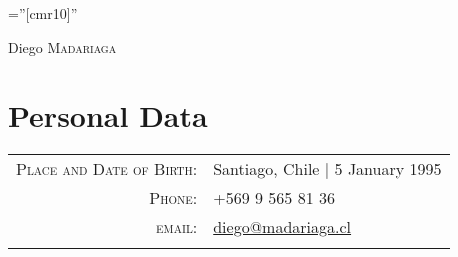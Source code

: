 \documentclass[a4paper,10pt]{article}
\begin{document}

\pagestyle{empty} %

\font\fb=''[cmr10]'' %

\par{\centering
		{\Huge Diego \textsc{Madariaga}
	}\bigskip\par}

\section{Personal Data}

\begin{tabular}{rl}
    \textsc{Place and Date of Birth:} & Santiago, Chile  | 5 January 1995 \\
    \textsc{Phone:}     & +569 9 565 81 36\\
    \textsc{email:}     & \href{mailto:diego@madariaga.cl}{diego@madariaga.cl}
    \\&\\
\end{tabular}

\end{document}
